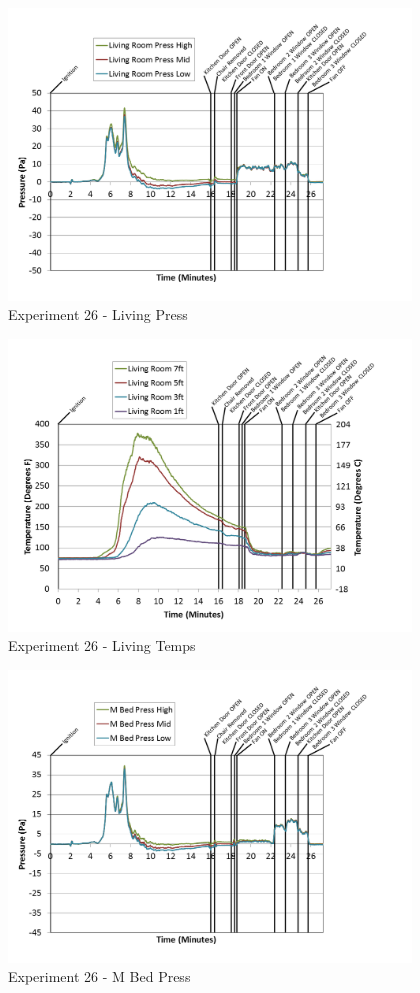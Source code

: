\documentclass{article}
\begin{document}
\begin{appendices}
\clearpage

\begin{figure}[h!]
	\centering
	\includegraphics[height=3.05in]{0_Images/Results_Charts/Exp_26_Charts/LivingPress.png}
	\caption{Experiment 26 - Living Press}
\end{figure}


\begin{figure}[h!]
	\centering
	\includegraphics[height=3.05in]{0_Images/Results_Charts/Exp_26_Charts/LivingTemps.png}
	\caption{Experiment 26 - Living Temps}
\end{figure}

\clearpage

\begin{figure}[h!]
	\centering
	\includegraphics[height=3.05in]{0_Images/Results_Charts/Exp_26_Charts/MBedPress.png}
	\caption{Experiment 26 - M Bed Press}
\end{figure}



\end{appendices}
\end{document}
